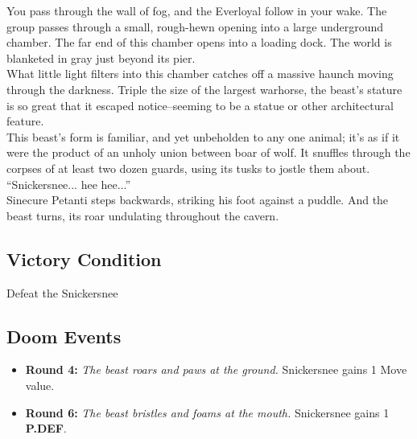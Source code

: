 You pass through the wall of fog, and the Everloyal follow in your wake. The group passes through a small, rough-hewn opening into a large underground chamber. The far end of this chamber opens into a loading dock. The world is blanketed in gray just beyond its pier.\\

What little light filters into this chamber catches off a massive haunch moving through the darkness. Triple the size of the largest warhorse, the beast's stature is so great that it escaped notice--seeming to be a statue or other architectural feature.\\

This beast's form is familiar, and yet unbeholden to any one animal; it's as if it were the product of an unholy union between boar of wolf. It snuffles through the corpses of at least two dozen guards, using its tusks to jostle them about.\\

“Snickersnee... hee hee...”\\

Sinecure Petanti steps backwards, striking his foot against a puddle. And the beast turns, its roar undulating throughout the cavern.

\subsection*{Victory Condition}
Defeat the Snickersnee

\subsection*{Doom Events}
\begin{itemize}
\item \textbf{Round 4:} \emph{The beast roars and paws at the ground.} Snickersnee gains 1 Move value.
\item \textbf{Round 6:} \emph{The beast bristles and foams at the mouth.} Snickersnee gains 1 \textbf{P.DEF}.
\end{itemize}

